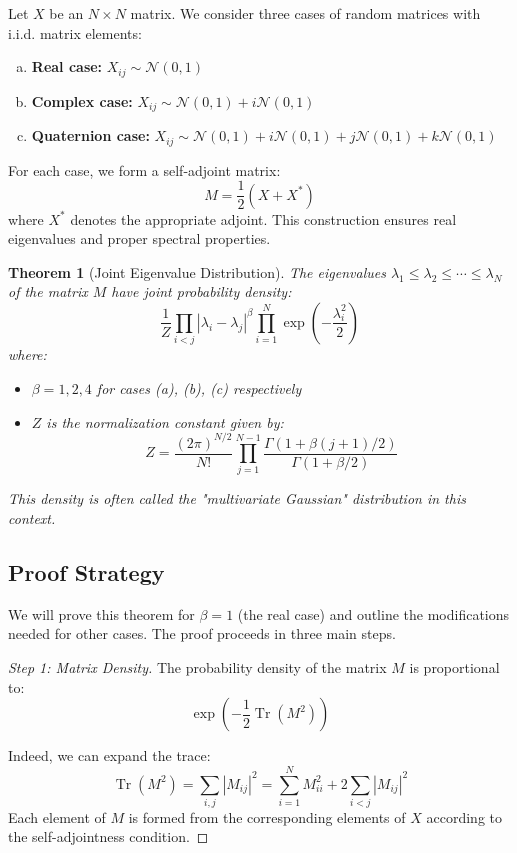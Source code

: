 \documentclass[letterpaper,11pt,oneside,reqno]{article}
\numberwithin{equation}{section}
\newtheorem{theorem}[proposition]{Theorem}
\theoremstyle{definition}
\begin{document}
Let $X$ be an $N\times N$ matrix. We consider three cases of random matrices with i.i.d. matrix elements:

\begin{enumerate}[a)]
\item \textbf{Real case:} $X_{ij} \sim \mathcal{N}(0,1)$
\item \textbf{Complex case:} $X_{ij} \sim \mathcal{N}(0,1) + i\mathcal{N}(0,1)$
\item \textbf{Quaternion case:} $X_{ij} \sim \mathcal{N}(0,1) + i\mathcal{N}(0,1) + j\mathcal{N}(0,1) + k\mathcal{N}(0,1)$
\end{enumerate}

For each case, we form a self-adjoint matrix:
\[ M = \frac{1}{2}(X + X^*) \]
where $X^*$ denotes the appropriate adjoint. This construction ensures real eigenvalues and proper spectral properties.

\begin{theorem}[Joint Eigenvalue Distribution]
\label{thm:joint_density}
The eigenvalues $\lambda_1 \leq \lambda_2 \leq \cdots \leq \lambda_N$ of the matrix $M$ have joint probability density:
\[ \frac{1}{Z} \prod_{i<j} |\lambda_i-\lambda_j|^\beta \prod_{i=1}^N \exp\left(-\frac{\lambda_i^2}{2}\right) \]
where:
\begin{itemize}
\item $\beta = 1,2,4$ for cases (a), (b), (c) respectively
\item $Z$ is the normalization constant given by:
\[ Z = \frac{(2\pi)^{N/2}}{N!} \prod_{j=1}^{N-1} \frac{\Gamma(1+\beta(j+1)/2)}{\Gamma(1+\beta/2)} \]
\end{itemize}
This density is often called the "multivariate Gaussian" distribution in this context.
\end{theorem}

\subsection{Proof Strategy}

We will prove this theorem for $\beta=1$ (the real case) and outline the modifications needed for other cases. The proof proceeds in three main steps.

\begin{proof}[Step 1: Matrix Density]
The probability density of the matrix $M$ is proportional to:
\[ \exp\left(-\frac{1}{2}\operatorname{Tr}(M^2)\right) \]

Indeed, we can expand the trace:
\[ \operatorname{Tr}(M^2) = \sum_{i,j} |M_{ij}|^2 = \sum_{i=1}^N M_{ii}^2 + 2\sum_{i<j} |M_{ij}|^2 \]
Each element of $M$ is formed from the corresponding elements of $X$ according to the self-adjointness condition.
\end{proof}
\end{document}
